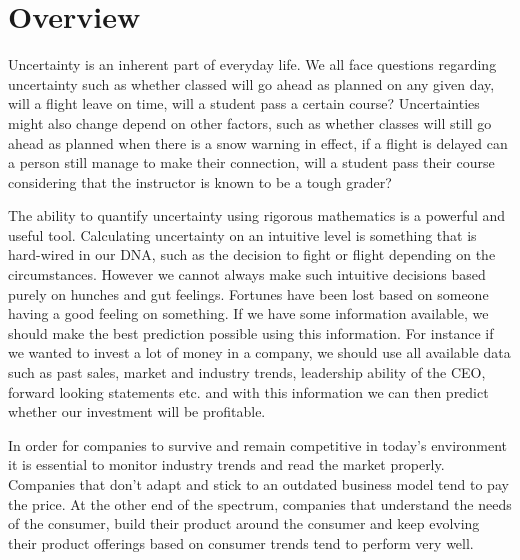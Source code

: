 \chapter{Overview}
\label{Overview}


Uncertainty is an inherent part of everyday life. 
We all face questions regarding uncertainty such as whether 
classed will go ahead as planned on any given day,
will a flight leave on time, 
will a student pass a certain course?
Uncertainties might also change depend on other factors, 
such as whether classes will still go ahead as planned when there is a snow warning in effect, 
if a flight is delayed can a person still manage to make their connection,
will a student pass their course considering that the instructor is known to be a tough grader?

The ability to quantify uncertainty using rigorous mathematics is a powerful and useful tool.
Calculating uncertainty on an intuitive level is something that is hard-wired in our DNA, 
such as the decision to fight or flight depending on the circumstances.
However we cannot always make such intuitive decisions
based purely on hunches and gut feelings.
Fortunes have been lost based on someone having a good feeling on something.
If we have some information available, we should make the best prediction possible using this information.
For instance if we wanted to invest a lot of money in a company, we should use all available data such as
past sales, market and industry trends, leadership ability of the CEO, forward looking statements etc. 
and with this information we can then predict whether our investment will be profitable.

In order for companies to survive and remain competitive in today's 
environment it is essential to monitor industry trends and read the market properly.
Companies that don't adapt and stick to an outdated business model
tend to pay the price.
At the other end of the spectrum, companies that understand the needs of the consumer, 
build their product around the consumer and keep evolving their product offerings based on
consumer trends tend to perform very well.

